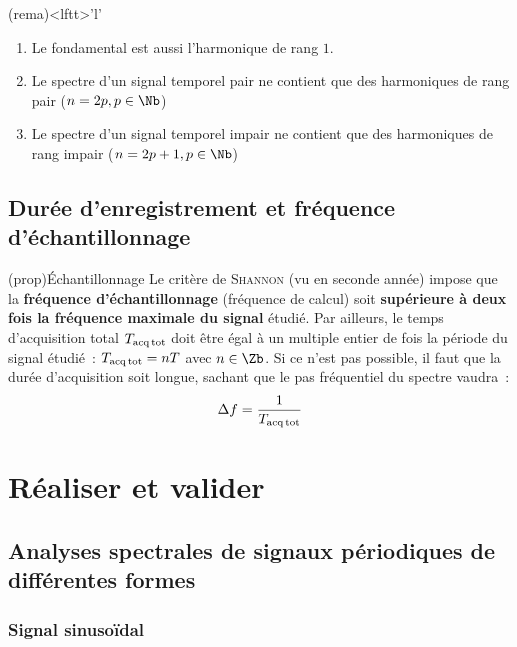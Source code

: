 \documentclass[../main/main.tex]{subfiles}
\begin{document}
{	\begin{tcb}(rema)<lftt>'l'{}
		\begin{enumerate}
			\item Le fondamental est aussi l'harmonique de rang $1$.
			\item Le spectre d'un signal temporel pair ne contient que des
			      harmoniques de rang pair ($n=2p, p\in\Nb$)
			\item Le spectre d'un signal temporel impair ne contient que des
			      harmoniques de rang impair ($n=2p+1, p\in\Nb$)
		\end{enumerate}
	\end{tcb}

	\subsection{Durée d'enregistrement et fréquence d'échantillonnage}

	\begin{tcb}(prop){Échantillonnage}
		Le critère de \textsc{Shannon} (vu en seconde année) impose que la
		\textbf{fréquence d'échantillonnage} (fréquence de calcul) soit
		\textbf{supérieure à deux fois la fréquence maximale du signal} étudié.
		\bigbreak
		Par ailleurs, le temps d'acquisition total $T_{\rm acq\, tot}$ doit être égal à
		un multiple entier de fois la période du signal étudié~: $T_{\rm acq\, tot} =
			nT$ avec $n\in \Zb$. Si ce n'est pas possible, il faut que la durée
		d'acquisition soit longue, sachant que le pas fréquentiel du spectre vaudra~:
		\[
			\Delta f = \frac{1}{T_{\rm acq\, tot}}
		\]
	\end{tcb}
}%

\setcounter{section}{2}
\section{Réaliser et valider}
\subsection{Analyses spectrales de signaux périodiques de différentes formes}
\subsubsection{Signal sinusoïdal}
\end{document}
